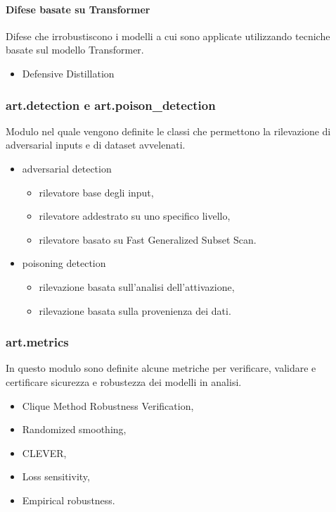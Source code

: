 \paragraph{Difese basate su Transformer}
Difese che irrobustiscono i modelli a cui sono applicate utilizzando tecniche basate sul modello Transformer.
    \begin{itemize}
        \item Defensive Distillation
    \end{itemize}

\subsubsection{art.detection e art.poison\_detection}
Modulo nel quale vengono definite le classi che permettono la rilevazione di adversarial inputs e  di dataset avvelenati.
\begin{itemize}
    \item adversarial detection \begin{itemize}
        \item rilevatore base degli input,
        \item rilevatore addestrato su uno specifico livello,
        \item rilevatore basato su Fast Generalized Subset Scan.
    \end{itemize}
    \item poisoning detection \begin{itemize}
        \item rilevazione basata sull'analisi dell'attivazione,
        \item rilevazione basata sulla provenienza dei dati.
    \end{itemize}
\end{itemize}
\subsubsection{art.metrics}
In questo modulo sono definite alcune metriche per verificare, validare e certificare sicurezza e robustezza dei modelli in analisi. 

\begin{itemize}
    \item Clique Method Robustness Verification,
    \item Randomized smoothing,
    \item CLEVER,
    \item Loss sensitivity,
    \item Empirical robustness.
\end{itemize}